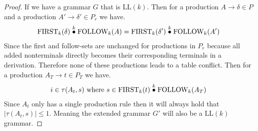 \documentclass[a4paper,12pt]{article}
\newcommand{\truncprod}[1]{\stackrel{\mathclap{#1}}{\bullet}}
\newcommand\LL{\text{LL}}
\newcommand\FIRST{\text{FIRST}}
\newcommand\FOLLOW{\text{FOLLOW}}
\theoremstyle{definition}
\begin{document}
\begin{proof}
  If we have a grammar $G$ that is $\LL(k)$. Then for a production $A \to \delta \in P$ and a production $A' \to \delta' \in P_r$ we have.
  \begin{align*}
    \FIRST_k(\delta) \truncprod{k} \FOLLOW_k(A) = \FIRST_k(\delta') \truncprod{k} \FOLLOW_k(A')
  \end{align*}
  Since the first and follow-sets are unchanged for productions in $P_r$ because all added nonterminals directly becomes their corresponding terminals in a derivation. Therefore none of these productions leads to a table conflict. Then for a production $A_T \to t \in P_T$ we have.
  \begin{gather*}
    i \in \tau(A_t, s) \text{ where } s \in \FIRST_k(t) \truncprod{k} \FOLLOW_k(A_T)
  \end{gather*}
  Since $A_t$ only has a single production rule then it will always hold that $|\tau(A_t, s)| \leq 1$. Meaning the extended grammar $G'$ will also be a $\LL(k)$ grammar.
\end{proof}
\end{document}
